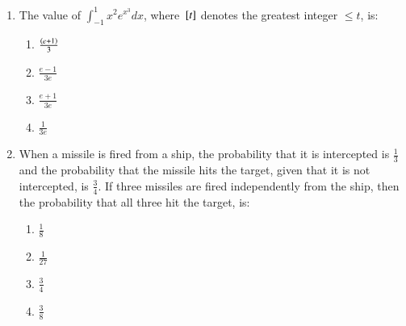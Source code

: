 \documentclass[journal,12pt,onecolumn]{IEEEtran}
\theoremstyle{remark}
\begin{document}
\begin{enumerate}[start=16]
\begin{enumerate}
		\end{enumerate}
	\item The value of $\int_{-1}^{1} x^2e^{x^3} dx$, where ${}\left[t\right]$ denotes the greatest integer $\leq t$, is:
		\begin{enumerate}
			\item $\frac{\left(e+1\right)}{3}$\\
			\item $\frac{e-1}{3e}$\\
			\item $\frac{e+1}{3e}$\\
			\item $\frac{1}{3e}$
		\end{enumerate}
	\item When a missile is fired from a ship, the probability that it is intercepted is $\frac{1}{3}$ and the probability that the missile hits the target, given that it is not intercepted, is $\frac{3}{4}$. If three missiles are fired independently from the ship, then the probability that all three hit the target, is:
		\begin{enumerate}
			\item $\frac{1}{8}$\\
			\item $\frac{1}{27}$\\
			\item $\frac{3}{4}$\\
			\item $\frac{3}{8}$
		\end{enumerate}
\end{enumerate}
\end{document}
